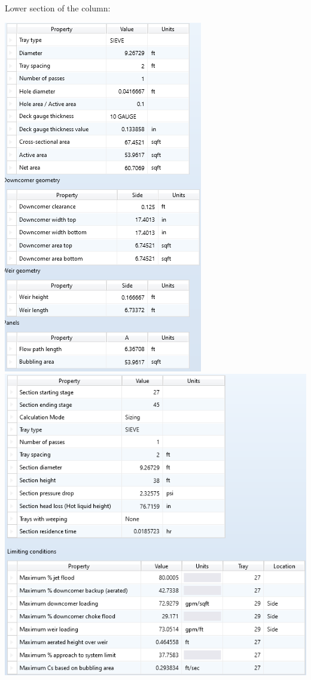 \documentclass[12pt]{article}
\begin{document}
Lower section of the column:
\begin{center}
    \includegraphics{sieve 2 upper geometry.png}
    \includegraphics[scale=0.9]{sieve 2 upper results.png}
\end{center}
\end{document}
